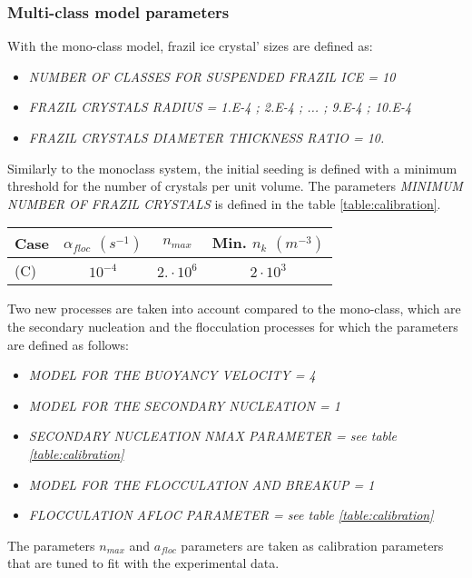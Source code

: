 \subsubsection{Multi-class model parameters}
With the mono-class model, frazil ice crystal' sizes are defined as:
\begin{itemize}
	\item\textit{NUMBER OF CLASSES FOR SUSPENDED FRAZIL ICE = 10}
	\item\textit{FRAZIL CRYSTALS RADIUS = 1.E-4 ; 2.E-4 ; ... ; 9.E-4 ; 10.E-4}
	\item\textit{FRAZIL CRYSTALS DIAMETER THICKNESS RATIO = 10.}
\end{itemize}

Similarly to the monoclass system, the initial seeding is defined 
with a minimum threshold for the number of crystals per unit volume.
The parameters \textit{MINIMUM NUMBER OF FRAZIL CRYSTALS} is
defined in the table \ref{table:calibration}.

\begin{center}
\begin{tabular}{lccc}
\hline
Case & $\alpha_{floc}$ $(s^{-1})$ & $n_{max}$ & Min. $n_k$ $(m^{-3})$ \\
\hline \hline
(C) & $10^{-4}$ & $2. \cdot 10^{6}$ & $2 \cdot 10^{3}$ \\
\hline
\end{tabular}
\label{table:calibration}
\end{center}

Two new processes are taken into account compared to the mono-class,
which are the secondary nucleation and the flocculation processes for which
the parameters are defined as follows:
\begin{itemize}
	\item\textit{MODEL FOR THE BUOYANCY VELOCITY = 4}
	\item\textit{MODEL FOR THE SECONDARY NUCLEATION = 1}
	\item\textit{SECONDARY NUCLEATION NMAX PARAMETER = see table \ref{table:calibration}}
	\item\textit{MODEL FOR THE FLOCCULATION AND BREAKUP = 1}
	\item\textit{FLOCCULATION AFLOC PARAMETER = see table \ref{table:calibration}}
\end{itemize}
The parameters $n_{max}$ and $a_{floc}$ parameters are taken as calibration parameters 
that are tuned to fit with the experimental data.

